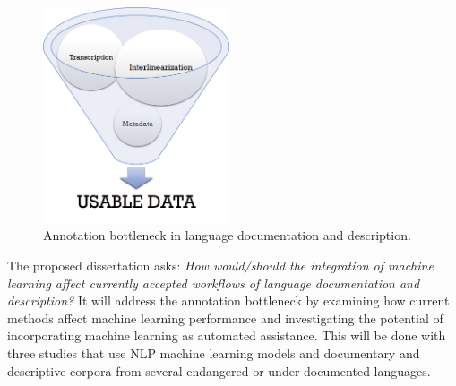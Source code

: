 \begin{figure}[hbt]
    \centering
    \includegraphics[width=5.5cm]{figs/AnnotationFunnel.jpg}
    \caption[Annotation Bottleneck]{Annotation bottleneck in language documentation and description.}
    \label{fig:bottleneck}
\end{figure}


The proposed dissertation asks: \emph{How would/should the integration of machine learning affect currently accepted workflows of language documentation and description?} It will address the annotation bottleneck by examining how current methods affect machine learning performance and investigating the potential of incorporating machine learning as automated assistance. This will be done with three studies that use NLP machine learning models and documentary and descriptive corpora from several endangered or under-documented languages.

